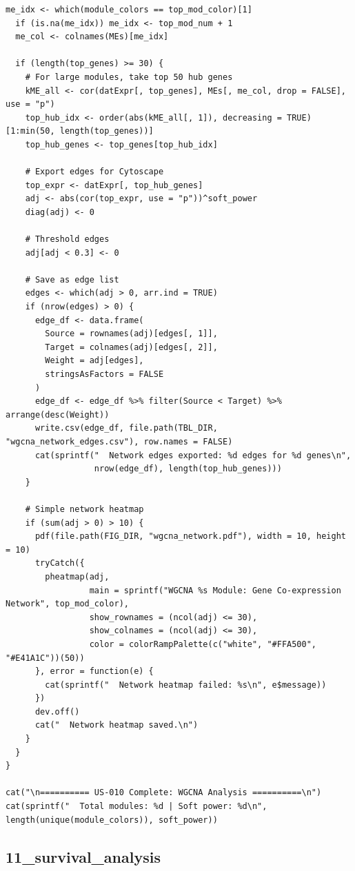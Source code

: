 \documentclass[12pt,a4paper]{ctexart}
\begin{document}
\begin{lstlisting}[caption={08_wgcna}, basicstyle=\ttfamily\scriptsize]
  me_idx <- which(module_colors == top_mod_color)[1]
  if (is.na(me_idx)) me_idx <- top_mod_num + 1
  me_col <- colnames(MEs)[me_idx]

  if (length(top_genes) >= 30) {
    # For large modules, take top 50 hub genes
    kME_all <- cor(datExpr[, top_genes], MEs[, me_col, drop = FALSE], use = "p")
    top_hub_idx <- order(abs(kME_all[, 1]), decreasing = TRUE)[1:min(50, length(top_genes))]
    top_hub_genes <- top_genes[top_hub_idx]

    # Export edges for Cytoscape
    top_expr <- datExpr[, top_hub_genes]
    adj <- abs(cor(top_expr, use = "p"))^soft_power
    diag(adj) <- 0

    # Threshold edges
    adj[adj < 0.3] <- 0

    # Save as edge list
    edges <- which(adj > 0, arr.ind = TRUE)
    if (nrow(edges) > 0) {
      edge_df <- data.frame(
        Source = rownames(adj)[edges[, 1]],
        Target = colnames(adj)[edges[, 2]],
        Weight = adj[edges],
        stringsAsFactors = FALSE
      )
      edge_df <- edge_df %>% filter(Source < Target) %>% arrange(desc(Weight))
      write.csv(edge_df, file.path(TBL_DIR, "wgcna_network_edges.csv"), row.names = FALSE)
      cat(sprintf("  Network edges exported: %d edges for %d genes\n",
                  nrow(edge_df), length(top_hub_genes)))
    }

    # Simple network heatmap
    if (sum(adj > 0) > 10) {
      pdf(file.path(FIG_DIR, "wgcna_network.pdf"), width = 10, height = 10)
      tryCatch({
        pheatmap(adj,
                 main = sprintf("WGCNA %s Module: Gene Co-expression Network", top_mod_color),
                 show_rownames = (ncol(adj) <= 30),
                 show_colnames = (ncol(adj) <= 30),
                 color = colorRampPalette(c("white", "#FFA500", "#E41A1C"))(50))
      }, error = function(e) {
        cat(sprintf("  Network heatmap failed: %s\n", e$message))
      })
      dev.off()
      cat("  Network heatmap saved.\n")
    }
  }
}

cat("\n========== US-010 Complete: WGCNA Analysis ==========\n")
cat(sprintf("  Total modules: %d | Soft power: %d\n", length(unique(module_colors)), soft_power))
\end{lstlisting}

\subsection{11_survival_analysis}
\end{document}
